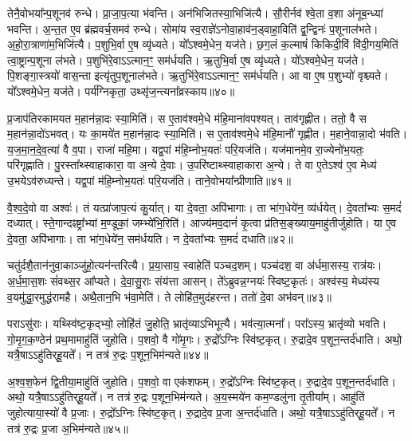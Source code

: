 तेनै॒वोभया᳚न्प॒शूनव॑ रुन्धे।
प्रा॒जा॒प॒त्या भ॑वन्ति।
अन॑भि\-जितस्या॒भि\-जि॑त्यै।
सौ॒रीर्नव॑ श्वे॒ता व॒शा अ॑नूब॒न्ध्या॑ भवन्ति।
अ॒न्त॒त ए॒व ब्र॑ह्म\-वर्च॒समव॑ रुन्धे।
सोमा॑य स्व॒राज्ञे॑\-ऽनोवा॒हाव॑न॒ड्वाहा॒विति॑ द्व॒न्द्विनः॑ प॒शूनाल॑भते।
अ॒हो॒रा॒त्राणा॑म॒भिजि॑त्यै।
प॒शुभि॒र्वा ए॒ष व्यृ॑ध्यते।
यो᳚ऽश्वमे॒धेन॒ यज॑ते।
छ॒ग॒लं क॒ल्माषं॑ किकिदी॒विं वि॑दी॒गय॒मिति॑ त्वा॒ष्ट्रान्प॒शूना ल॑भते।
प॒शुभि॑रे॒वाऽऽत्मान॒ꣳ॒ सम॑र्धयति।
ऋ॒तुभि॒र्वा ए॒ष व्यृ॑ध्यते।
यो᳚ऽश्वमे॒धेन॒ यज॑ते।
पि॒शङ्गा॒स्त्रयो॑ वास॒न्ता इत्यृ॑तुप॒शूनाल॑भते।
ऋ॒तुभि॑रे॒वाऽऽत्मान॒ꣳ॒ सम॑र्धयति।
आ वा ए॒ष प॒शुभ्यो॑ वृश्च्यते।
यो᳚ऽश्वमे॒धेन॒ यज॑ते।
पर्य॑ग्निकृता॒ उथ्सृ॑ज॒न्त्यना᳚व्रस्काय॥४०॥\ip\anuvakamend[ल॒भ्य॒न्ते॒ ल॒भ॒ते॒ त्वा॒ष्ट्रान्प॒शूनाल॑भते॒\-ऽष्टौ च॑]

प्र॒जा\-प॑तिरकामयत म॒हान॑न्ना॒दः स्या॒मिति॑।
स ए॒ताव॑श्वमे॒धे म॑हि॒माना॑वपश्यत्।
ताव॑गृह्णीत।
ततो॒ वै स म॒हान॑न्ना॒दो॑\-ऽभवत्।
यः का॒मये॑त म॒हान॑न्ना॒दः स्या॒मिति॑।
स ए॒ताव॑श्वमे॒धे म॑हि॒मानौ॑ गृह्णीत।
म॒हाने॒वान्ना॒दो भ॑वति।
य॒ज॒मा॒न॒दे॒व॒त्या॑ वै व॒पा।
राजा॑ महि॒मा।
यद्व॒पां म॑हि॒म्नोभ॒यतः॑ परि॒यज॑ति।
यज॑मानमे॒व रा॒ज्येनो॑भ॒यतः॒ परि॑गृह्णाति।
पु॒रस्ता᳚थ्स्वाहाकारा॒ वा अ॒न्ये दे॒वाः।
उ॒परि॑ष्टाथ्स्वाहाकारा अ॒न्ये।
ते वा ए॒ते\-ऽश्व॑ ए॒व मेध्य॑ उ॒भये\-ऽव॑रुध्यन्ते।
यद्व॒पां म॑हि॒म्नोभ॒यतः॑ परि॒यज॑ति।
ताने॒वोभया᳚न्प्रीणाति॥४१॥\ip\anuvakamend[प॒रि॒यज॑ति॒ षट्च॑]

वै॒श्व॒दे॒वो वा अश्वः॑।
तं यत्प्रा॑जाप॒त्यं कु॒र्यात्।
या दे॒वता॒ अपि॑भागाः।
ता भा॑ग॒धेये॑न॒ व्य॑र्धयेत्।
दे॒वता᳚भ्यः स॒मदं॑ दध्यात्।
स्ते॒गान्दꣴष्ट्रा᳚भ्यां म॒ण्डूकां॒ जम्भ्ये॑भि॒रिति॑।
आज्य॑मव॒दानं॑ कृ॒त्वा प्र॑तिस॒ङ्ख्याय॒माहु॑तीर्जुहोति।
या ए॒व दे॒वता॒ अपि॑भागाः।
ता भा॑ग॒धेये॑न॒ सम॑र्धयति।
न दे॒वता᳚भ्यः स॒मदं॑ दधाति॥४२॥\ip

चतु॑र्दशै॒तान॑नुवा॒काञ्जु॑हो॒त्यन॑न्तरित्यै।
प्र॒या॒साय॒ स्वाहेति॑ पञ्चद॒शम्।
पञ्च॑दश॒ वा अ॑र्धमा॒सस्य॒ रात्र॑यः।
अ॒र्ध॒मा॒स॒शः सं॑वथ्स॒र आ᳚प्यते।
दे॒वा॒सु॒राः संय॑त्ता आसन्।
ते᳚ऽब्रुवन्न॒ग्नयः॑ स्विष्ट॒कृतः॑।
अश्व॑स्य॒ मेध्य॑स्य व॒यमु॑द्धा॒रमुद्ध॑रामहै।
अथै॒तान॒भि भ॑वा॒मेति॑।
ते लोहि॑त॒मुद॑हरन्त।
ततो॑ दे॒वा अभ॑वन्॥४३॥\ip

पराऽसु॑राः।
यथ्स्वि॑ष्ट॒कृद्भ्यो॒ लोहि॑तं जु॒होति॒ भ्रातृ॑व्याऽभिभूत्यै।
भव॑त्या॒त्मना᳚।
परा᳚ऽस्य॒ भ्रातृ॑व्यो भवति।
गो॒मृ॒ग॒क॒ण्ठेन॑ प्रथ॒मामाहु॑तिं जुहोति।
प॒शवो॒ वै गो॑मृ॒गः।
रु॒द्रो᳚\-ऽग्निः स्वि॑ष्ट॒कृत्।
रु॒द्रादे॒व प॒शून॒न्तर्द॑धाति।
अथो॒ यत्रै॒षा\-ऽऽहु॑तिर्‌\mbox{}हू॒यते᳚।
न तत्र॑ रु॒द्रः प॒शून॒भिम॑न्यते॥४४॥\ip

अ॒श्व॒श॒फेन॑ द्वि॒तीया॒माहु॑तिं जुहोति।
प॒शवो॒ वा एक॑शफम्।
रु॒द्रो᳚\-ऽग्निः स्वि॑ष्ट॒कृत्।
रु॒द्रादे॒व प॒शून॒न्तर्द॑धाति।
अथो॒ यत्रै॒षा\-ऽऽहु॑तिर्‌\mbox{}हू॒यते᳚।
न तत्र॑ रु॒द्रः प॒शून॒भिम॑न्यते।
अ॒य॒स्मये॑न कम॒ण्डलु॑ना तृ॒तीया᳚म्।
आहु॑तिं जुहोत्याया॒स्यो॑ वै प्र॒जाः।
रु॒द्रो᳚\-ऽग्निः स्वि॑ष्ट॒कृत्।
रु॒द्रादे॒व प्र॒जा अ॒न्तर्द॑धाति।
अथो॒ यत्रै॒षा\-ऽऽहु॑तिर्‌\mbox{}हू॒यते᳚।
न तत्र॑ रु॒द्रः प्र॒जा अ॒भिम॑न्यते॥४५॥\ip\anuvakamend[द॒धा॒त्यभ॑वन्मन्यते प्र॒जा अ॒न्तर्द॑धाति॒ द्वे च॑ ]

